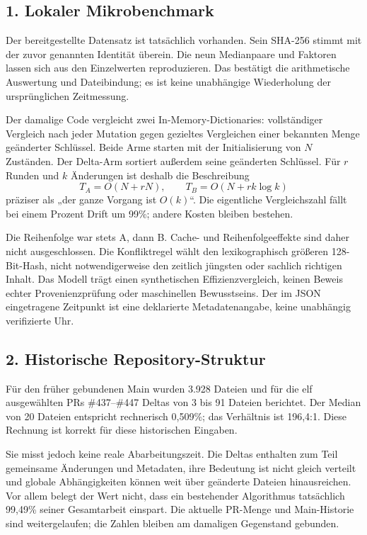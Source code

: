 \begin{cols}
\subsection*{1. Lokaler Mikrobenchmark}
Der bereitgestellte Datensatz ist tatsächlich vorhanden. Sein SHA-256 stimmt mit der zuvor genannten Identität überein. Die neun Medianpaare und Faktoren lassen sich aus den Einzelwerten reproduzieren. Das bestätigt die arithmetische Auswertung und Dateibindung; es ist keine unabhängige Wiederholung der ursprünglichen Zeitmessung. 

Der damalige Code vergleicht zwei In-Memory-Dictionaries: vollständiger Vergleich nach jeder Mutation gegen gezieltes Vergleichen einer bekannten Menge geänderter Schlüssel. Beide Arme starten mit der Initialisierung von $N$ Zuständen. Der Delta-Arm sortiert außerdem seine geänderten Schlüssel. Für $r$ Runden und $k$ Änderungen ist deshalb die Beschreibung
\[
 T_A=O(N+rN),\qquad T_B=O(N+rk\log k)
\]
präziser als „der ganze Vorgang ist $O(k)$“. Die eigentliche Vergleichszahl fällt bei einem Prozent Drift um 99\%; andere Kosten bleiben bestehen.

Die Reihenfolge war stets A, dann B. Cache- und Reihenfolgeeffekte sind daher nicht ausgeschlossen. Die Konfliktregel wählt den lexikographisch größeren 128-Bit-Hash, nicht notwendigerweise den zeitlich jüngsten oder sachlich richtigen Inhalt. Das Modell trägt einen synthetischen Effizienzvergleich, keinen Beweis echter Provenienzprüfung oder maschinellen Bewusstseins. Der im JSON eingetragene Zeitpunkt ist eine deklarierte Metadatenangabe, keine unabhängig verifizierte Uhr.

\subsection*{2. Historische Repository-Struktur}
Für den früher gebundenen Main wurden 3.928 Dateien und für die elf ausgewählten PRs \#437–\#447 Deltas von 3 bis 91 Dateien berichtet. Der Median von 20 Dateien entspricht rechnerisch 0,509\%; das Verhältnis ist 196,4:1. Diese Rechnung ist korrekt für diese historischen Eingaben. 

Sie misst jedoch keine reale Abarbeitungszeit. Die Deltas enthalten zum Teil gemeinsame Änderungen und Metadaten, ihre Bedeutung ist nicht gleich verteilt und globale Abhängigkeiten können weit über geänderte Dateien hinausreichen. Vor allem belegt der Wert nicht, dass ein bestehender Algorithmus tatsächlich 99,49\% seiner Gesamtarbeit einspart. Die aktuelle PR-Menge und Main-Historie sind weitergelaufen; die Zahlen bleiben am damaligen Gegenstand gebunden.


\end{cols}
